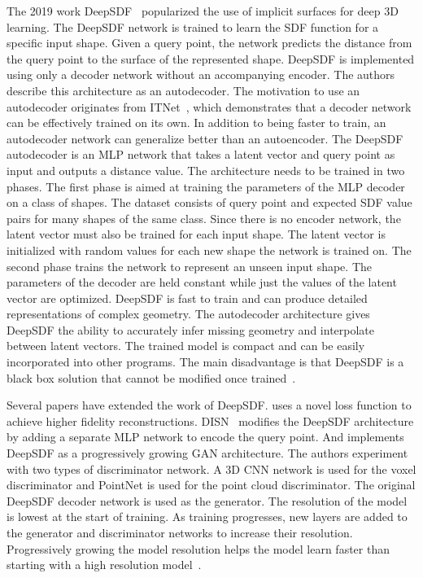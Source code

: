 The 2019 work DeepSDF~\cite{Park2019} popularized the use of implicit surfaces for deep 3D learning. The DeepSDF network is trained to learn the SDF function for a specific input shape. Given a query point, the network predicts the distance from the query point to the surface of the represented shape. DeepSDF is implemented using only a decoder network without an accompanying encoder. The authors describe this architecture as an autodecoder. The motivation to use an autodecoder originates from ITNet~\cite{Tan1995}, which demonstrates that a decoder network can be effectively trained on its own. In addition to being faster to train, an autodecoder network can generalize better than an autoencoder. The DeepSDF autodecoder is an MLP network that takes a latent vector and query point as input and outputs a distance value. The architecture needs to be trained in two phases. The first phase is aimed at training the parameters of the MLP decoder on a class of shapes. The dataset consists of query point and expected SDF value pairs for many shapes of the same class. Since there is no encoder network, the latent vector must also be trained for each input shape. The latent vector is initialized with random values for each new shape the network is trained on. The second phase trains the network to represent an unseen input shape. The parameters of the decoder are held constant while just the values of the latent vector are optimized. DeepSDF is fast to train and can produce detailed representations of complex geometry. The autodecoder architecture gives DeepSDF the ability to accurately infer missing geometry and interpolate between latent vectors. The trained model is compact and can be easily incorporated into other programs. The main disadvantage is that DeepSDF is a black box solution that cannot be modified once trained~\cite{Park2019}.

Several papers have extended the work of DeepSDF. \cite{Gropp2020} uses a novel loss function to achieve higher fidelity reconstructions. DISN~\cite{Xu2019} modifies the DeepSDF architecture by adding a separate MLP network to encode the query point. And \cite{Kleineberg2020} implements DeepSDF as a progressively growing GAN architecture. The authors experiment with two types of discriminator network. A 3D CNN network is used for the voxel discriminator and PointNet is used for the point cloud discriminator. The original DeepSDF decoder network is used as the generator. The resolution of the model is lowest at the start of training. As training progresses, new layers are added to the generator and discriminator networks to increase their resolution. Progressively growing the model resolution helps the model learn faster than starting with a high resolution model~\cite{Kleineberg2020}.

